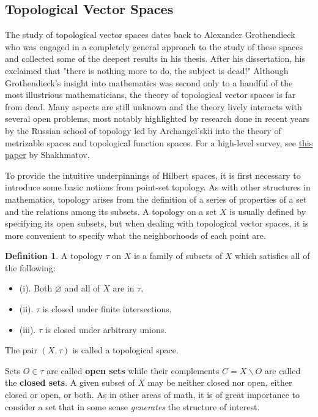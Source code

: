\documentclass{article}
\theoremstyle{definition}
\newtheorem{defn}[thm]{Definition}
\theoremstyle{remark}
\numberwithin{equation}{section}
\begin{document}
\subsection{Topological Vector Spaces} 
The study of topological vector spaces dates back to Alexander Grothendieck who was engaged in a completely general approach to the study of these spaces and collected some of the deepest results in his thesis. After his dissertation, his exclaimed that "there is nothing more to do, the subject is dead!" Although Grothendieck's insight into mathematics was second only to a handful of the most illustrious mathematicians, the theory of topological vector spaces is far from dead. Many aspects are still unknown and the theory lively interacts with several open problems, most notably highlighted by research done in recent years by the Russian school of topology led by Archangel'skii into the theory of metrizable spaces and topological function spaces. For a high-level survey, see \href{https://doi.org/10.1016/S0166-8641(97)00242-3}{this paper} by Shakhmatov. 

 To provide the intuitive underpinnings of Hilbert spaces, it is first necessary to introduce some basic notions from point-set topology. As with other structures in mathematics, topology arises from the definition of a series of properties of a set and the relations among its subsets. A topology on a set $X$ is usually defined by specifying its open subsets, but when dealing with topological vector spaces, it is more convenient to specify what the neighborhoods of each point are.

\begin{defn}
A topology $\tau$ on $X$ is a family of subsets of $X$ which satisfies all of the following: 
\begin{itemize}
    \item (i). Both $\varnothing$ and all of $X$ are in $\tau,$
    \item (ii). $\tau$ is closed under finite intersections, 
    \item (iii). $\tau$ is closed under arbitrary unions. 
\end{itemize}
The pair $(X, \tau)$ is called a topological space. 
\end{defn}

Sets $O \in \tau$ are called \textbf{open sets} while their complements $C = X \backslash O$ are called the \textbf{closed sets}. A given subset of $X$ may be neither closed nor open, either closed or open, or both. As in other areas of math, it is of great importance to consider a set that in some sense \textit{generates} the structure of interest. 
\end{document}
